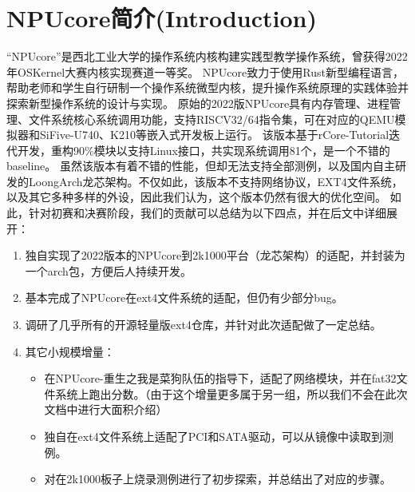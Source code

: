 \chapter{NPUcore简介(Introduction)}

“NPUcore”是西北工业大学的操作系统内核构建实践型教学操作系统，曾获得2022年OSKernel大赛内核实现赛道一等奖。
NPUcore致力于使用Rust新型编程语言，帮助老师和学生自行研制一个操作系统微型内核，提升操作系统原理的实践体验并探索新型操作系统的设计与实现。
原始的2022版NPUcore具有内存管理、进程管理、文件系统核心系统调用功能，支持RISCV32/64指令集，可在对应的QEMU模拟器和SiFive-U740、K210等嵌入式开发板上运行。
该版本基于rCore-Tutorial迭代开发，重构90\%模块以支持Linux接口，共实现系统调用81个，是一个不错的baseline。
虽然该版本有着不错的性能，但却无法支持全部测例，以及国内自主研发的LoongArch龙芯架构。不仅如此，该版本不支持网络协议，EXT4文件系统，以及其它多种多样的外设，因此我们认为，这个版本仍然有很大的优化空间。
如此，针对初赛和决赛阶段，我们的贡献可以总结为以下四点，并在后文中详细展开：
\begin{enumerate}
    \item 独自实现了2022版本的NPUcore到2k1000平台（龙芯架构）的适配，并封装为一个arch包，方便后人持续开发。
    \item 基本完成了NPUcore在ext4文件系统的适配，但仍有少部分bug。
    \item 调研了几乎所有的开源轻量版ext4仓库，并针对此次适配做了一定总结。
    \item 其它小规模增量：
    \begin{itemize}
        \item 在NPUcore-重生之我是菜狗队伍的指导下，适配了网络模块，并在fat32文件系统上跑出分数。（由于这个增量更多属于另一组，所以我们不会在此次文档中进行大面积介绍）
        \item 独自在ext4文件系统上适配了PCI和SATA驱动，可以从镜像中读取到测例。
        \item 对在2k1000板子上烧录测例进行了初步探索，并总结出了对应的步骤。
    \end{itemize}
\end{enumerate}



